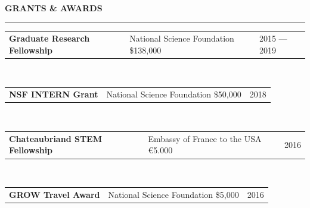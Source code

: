 \documentclass{resume} %
\begin{document}
\begin{minipage}{\textwidth}

\sectionskip
\MakeUppercase{\textbf{Grants \& Awards}}
  \sectionlineskip
  \hrule

\vspace{.5cm}



\begin{tabular}{@{}p{}p{}@{}p{}@{}}
  {\bf Graduate Research Fellowship}
  &
  {\footnotesize National Science Foundation \hfill \${138,000}\hspace{0.5cm}}
  &
  \hfill  {2015 --- 2019}
\end{tabular}
\\

\begin{tabular}{@{}p{}p{}@{}p{}@{}}
{\bf NSF INTERN Grant}
  &
{\footnotesize National Science Foundation \hfill \${50,000}\hspace{0.5cm}}
  &
 \hfill {2018}
\end{tabular}
\\

\begin{tabular}{@{}p{}p{}@{}p{}@{}}
{\bf Chateaubriand STEM Fellowship}
  &
{\footnotesize Embassy of France to the USA \hfill \euro{5.000} \hspace{0.5cm}}
  &
 \hfill {2016}
\end{tabular}
\\

\begin{tabular}{@{}p{}p{}@{}p{}@{}}
{\bf GROW Travel Award}
  &
 {\footnotesize National Science Foundation \hfill \${5,000}\hspace{0.5cm}}
  &
 \hfill {2016}
\end{tabular}
\\



\end{minipage}
\end{document}
